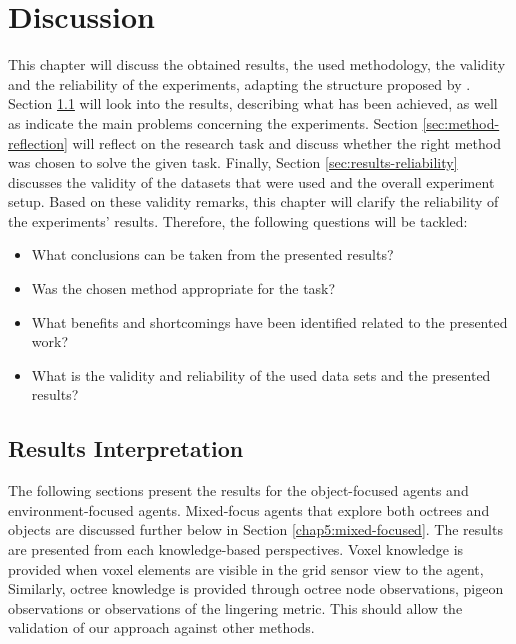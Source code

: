 \chapter{Discussion}\label{chap:discussion}



This chapter will discuss the obtained results, the used methodology, the validity and the reliability of the experiments, adapting the structure proposed by \textcite{luckert2016using}. Section \ref{sec:results-interpretation} will look into the results, describing what has been achieved, as well as indicate the main problems concerning the experiments. Section \ref{sec:method-reflection} will reflect on the research task and discuss whether the right method was chosen to solve the given task. Finally, Section \ref{sec:results-reliability} discusses the validity of the datasets that were used and the overall experiment setup. Based on these validity remarks, this chapter will clarify the reliability of the experiments' results. Therefore, the following questions will be tackled:
\begin{itemize}
    \item What conclusions can be taken from the presented results?
    \item Was the chosen method appropriate for the task?
    \item What benefits and shortcomings have been identified related to the presented work?
    \item What is the validity and reliability of the used data sets and the presented results?
\end{itemize}


\section{Results Interpretation}\label{sec:results-interpretation}

 The following sections present the results for the object-focused agents and environment-focused agents. Mixed-focus agents that explore both octrees and objects are discussed further below in Section \ref{chap5:mixed-focused}. The results are presented from each knowledge-based perspectives. 
 Voxel knowledge is provided when voxel elements are visible in the grid sensor view to the agent, Similarly, octree knowledge is provided through octree node observations, pigeon observations or observations of the lingering metric. This should allow the validation of our approach against other methods.
 
